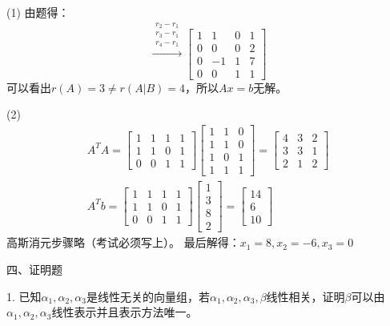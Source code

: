 \documentclass{article}
\begin{document}
\begin{jie}
(1)
由题得：
\begin{equation*}
[A|B]\xrightarrow{\substack{r_2-r_1\\r_3-r_1 \\ r_4-r_1}}
{
\begin{bmatrix}
  1 & 1 & 0 & 1\\
  0 & 0 & 0 &2 \\
  0 & -1 & 1 & 7\\
  0 & 0& 1 &1
\end{bmatrix}
}
\end{equation*}
可以看出$r(A)=3\neq r(A|B)=4$，所以$Ax=b$无解。

(2)
\begin{gather*}
  A^TA=\begin{bmatrix}
  1 & 1 & 1& 1\\
  1 & 1 & 0& 1\\
  0 & 0 & 1& 1
\end{bmatrix}\begin{bmatrix}
  1 & 1 & 0\\
  1 & 1 & 0\\
  1 & 0 & 1\\
  1 & 1 & 1
\end{bmatrix}=
\begin{bmatrix}
  4 & 3 & 2\\
  3 & 3 & 1\\
  2 & 1 & 2
\end{bmatrix}\\
A^Tb=\begin{bmatrix}
  1 & 1 & 1& 1\\
  1 & 1 & 0& 1\\
  0 & 0 & 1& 1
\end{bmatrix}\begin{bmatrix}
1 \\ 3 \\ 8 \\ 2
\end{bmatrix}=
\begin{bmatrix}
14 \\ 6 \\ 10
\end{bmatrix}
\end{gather*}
高斯消元步骤略（考试必须写上）。
最后解得：$x_1=8,x_2=-6,x_3=0$
\end{jie}


四、证明题

1. 已知$\alpha_{1},\alpha_{2},\alpha_{3}$是线性无关的向量组，若$\alpha_{1},\alpha_{2},\alpha_{3},\beta$线性相关，证明$\beta$可以由$\alpha_{1},\alpha_{2},\alpha_{3}$线性表示并且表示方法唯一。
\end{document}
